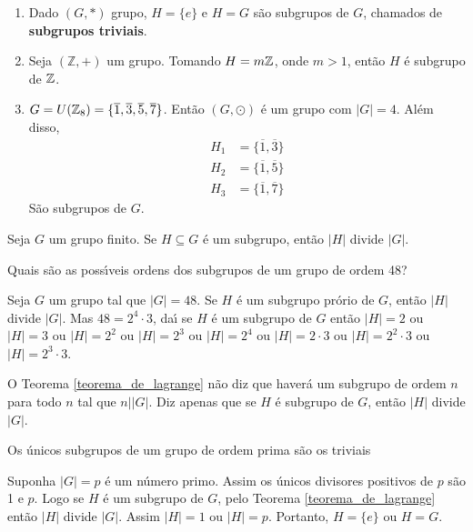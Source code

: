 \begin{exemplos}
	\begin{enumerate}[label={\arabic*})]
		\item Dado $(G,*)$ grupo, $H=\{e\}$ e $H=G$ s{\~a}o subgrupos de $G$, chamados de \textbf{subgrupos triviais}.
		\item Seja $(\mathbb{Z},+)$ um grupo. Tomando $H = m\mathbb{Z}$, onde $m > 1$, ent{\~a}o $H$ {\'e} subgrupo de $\mathbb{Z}$.
		\item $G = U(\mathbb{Z}_8) = \{\overline{1}, \overline{3}, \overline{5}, \overline{7}\}$. Ent\~ao $(G,\odot)$ {\'e} um grupo com $|G| = 4$. Al\'em disso,
		\begin{align*}
			H_1 &= \{\overline{1}, \overline{3}\}\\
			H_2 &= \{\overline{1}, \overline{5}\}\\
			H_3 &= \{\overline{1}, \overline{7}\}
		\end{align*}
		S\~ao subgrupos de $G$.
		
	\end{enumerate}
\end{exemplos}


\begin{teorema}\label{teorema_de_lagrange}
	Seja $G$ um grupo finito. Se $H\subseteq G$ {\'e} um subgrupo, ent{\~a}o $|H|$ divide $|G|$.
\end{teorema}

\begin{exemplo}
	Quais s{\~a}o as poss{\'\i}veis ordens dos subgrupos de um grupo de ordem 48?
	\begin{solucao}
		Seja $G$ um grupo tal que $|G|=48$. Se $H$ {\'e} um subgrupo pr\'orio de $G$, ent{\~a}o $|H|$ divide $|G|$. Mas $48=2^{4}\cdot 3$, da{\'\i} se $H$ \'e um subgrupo de $G$ ent\~ao $|H|=2$ ou $|H|=3$ ou $|H|= 2^{2}$ ou $|H|=2^{3}$ ou $|H|=2^{4}$ ou $|H|=2\cdot3$ ou $|H|=2^2\cdot 3$ ou $|H|=2^3\cdot 3$.
	\end{solucao}
\end{exemplo}

\begin{observacao}
	O Teorema \ref{teorema_de_lagrange} n{\~a}o diz que haver{\'a} um subgrupo de ordem $n$ para todo $n$ tal que $n||G|$. Diz apenas que se $H$ {\'e} subgrupo de $G$, ent{\~a}o $|H|$ divide $|G|$.
\end{observacao}

\begin{corolario}
	Os {\'u}nicos subgrupos de um grupo de ordem prima s{\~a}o os triviais
\end{corolario}
\begin{prova}
	Suponha $|G| = p$ \'e um n\'umero primo. Assim os {\'u}nicos divisores positivos de $p$ s{\~a}o 1 e $p$. Logo se $H$ {\'e} um subgrupo de $G$, pelo Teorema \ref{teorema_de_lagrange} ent{\~a}o $|H|$ divide $|G|$. Assim $|H| = 1$ ou $|H| = p$. Portanto, $H=\{e\}$ ou $H = G$.
\end{prova}

